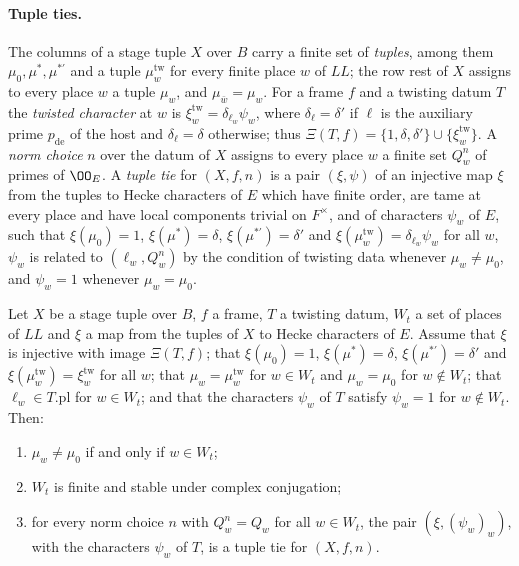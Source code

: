 \paragraph{Tuple ties.}
The columns of a stage tuple $X$ over $B$ carry a finite set of \emph{tuples}, among them $\mu_0,\mu^*,\mu^{*\prime}$ and a tuple
$\mu^{\mathrm{tw}}_w$ for every finite place $w$ of $\mathit{LL}$; the row rest of $X$ assigns to every place $w$ a tuple $\mu_w$, and
$\mu_{\bar w}=\mu_w$. For a frame $f$ and a twisting datum $T$ the \emph{twisted character} at $w$ is $\xi^{\mathrm{tw}}_w=\delta_{\ell_w}\psi_w$,
where $\delta_\ell=\delta'$ if $\ell$ is the auxiliary prime $p_{\mathrm{de}}$ of the host and $\delta_\ell=\delta$ otherwise; thus
$\Xi(T,f)=\{1,\delta,\delta'\}\cup\{\xi^{\mathrm{tw}}_w\}$. A \emph{norm choice} $n$ over the datum of $X$ assigns to every place $w$ a
finite set $Q^n_w$ of primes of $\OO_E$. A \emph{tuple tie} for $(X,f,n)$ is a pair $(\xi,\psi)$ of an injective map $\xi$ from the
tuples to Hecke characters of $E$ which have finite order, are tame at every place and have local components trivial on $F^\times$, and
of characters $\psi_w$ of $E$, such that $\xi(\mu_0)=1$, $\xi(\mu^*)=\delta$, $\xi(\mu^{*\prime})=\delta'$ and
$\xi(\mu^{\mathrm{tw}}_w)=\delta_{\ell_w}\psi_w$ for all $w$, $\psi_w$ is related to $(\ell_w,Q^n_w)$ by the condition of twisting data
whenever $\mu_w\neq\mu_0$, and $\psi_w=1$ whenever $\mu_w=\mu_0$.

\begin{lemma}\label{pf:bundles:lem:tuptie}
Let $X$ be a stage tuple over $B$, $f$ a frame, $T$ a twisting datum, $W_t$ a set of places of $\mathit{LL}$ and $\xi$ a map from the
tuples of $X$ to Hecke characters of $E$. Assume that $\xi$ is injective with image $\Xi(T,f)$; that $\xi(\mu_0)=1$, $\xi(\mu^*)=\delta$,
$\xi(\mu^{*\prime})=\delta'$ and $\xi(\mu^{\mathrm{tw}}_w)=\xi^{\mathrm{tw}}_w$ for all $w$; that $\mu_w=\mu^{\mathrm{tw}}_w$ for $w\in W_t$
and $\mu_w=\mu_0$ for $w\notin W_t$; that $\ell_w\in T.\mathrm{pl}$ for $w\in W_t$; and that the characters $\psi_w$ of $T$ satisfy $\psi_w=1$
for $w\notin W_t$. Then:
\begin{enumerate}[label=(\alph*)]
\item $\mu_w\neq\mu_0$ if and only if $w\in W_t$;
\item $W_t$ is finite and stable under complex conjugation;
\item for every norm choice $n$ with $Q^n_w=Q_w$ for all $w\in W_t$, the pair $(\xi,(\psi_w)_w)$, with the characters $\psi_w$ of $T$, is
a tuple tie for $(X,f,n)$.
\end{enumerate}
\end{lemma}

